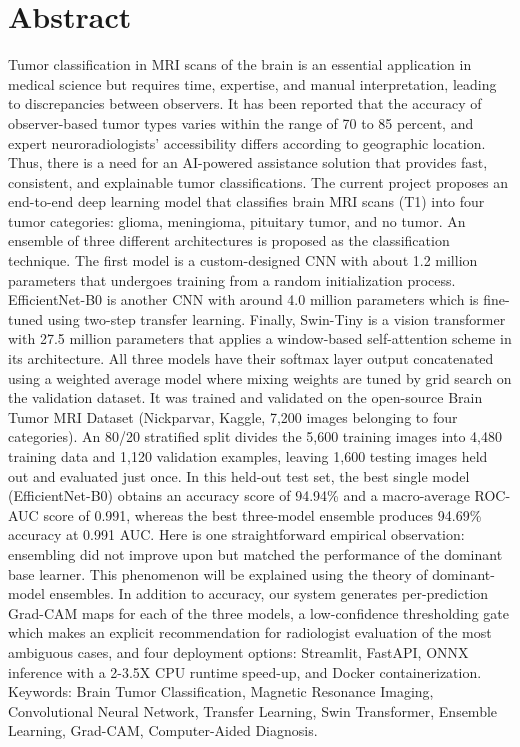 \documentclass[12pt,a4paper,oneside]{report}
\begin{document}
\chapter*{Abstract}
Tumor classification in MRI scans of the brain is an essential application in medical science but requires time, expertise, and manual interpretation, leading to discrepancies between observers. It has been reported that the accuracy of observer-based tumor types varies within the range of 70 to 85 percent, and expert neuroradiologists' accessibility differs according to geographic location. Thus, there is a need for an AI-powered assistance solution that provides fast, consistent, and explainable tumor classifications.
The current project proposes an end-to-end deep learning model that classifies brain MRI scans (T1) into four tumor categories: glioma, meningioma, pituitary tumor, and no tumor. An ensemble of three different architectures is proposed as the classification technique. The first model is a custom-designed CNN with about 1.2 million parameters that undergoes training from a random initialization process. EfficientNet-B0 is another CNN with around 4.0 million parameters which is fine-tuned using two-step transfer learning. Finally, Swin-Tiny is a vision transformer with 27.5 million parameters that applies a window-based self-attention scheme in its architecture. All three models have their softmax layer output concatenated using a weighted average model where mixing weights are tuned by grid search on the validation dataset.
It was trained and validated on the open-source Brain Tumor MRI Dataset (Nickparvar, Kaggle, 7,200 images belonging to four categories). An 80/20 stratified split divides the 5,600 training images into 4,480 training data and 1,120 validation examples, leaving 1,600 testing images held out and evaluated just once. In this held-out test set, the best single model (EfficientNet-B0) obtains an accuracy score of 94.94\% and a macro-average ROC-AUC score of 0.991, whereas the best three-model ensemble produces 94.69\% accuracy at 0.991 AUC. Here is one straightforward empirical observation: ensembling did not improve upon but matched the performance of the dominant base learner. This phenomenon will be explained using the theory of dominant-model ensembles.
In addition to accuracy, our system generates per-prediction Grad-CAM maps for each of the three models, a low-confidence thresholding gate which makes an explicit recommendation for radiologist evaluation of the most ambiguous cases, and four deployment options: Streamlit, FastAPI, ONNX inference with a 2-3.5X CPU runtime speed-up, and Docker containerization.
Keywords: Brain Tumor Classification, Magnetic Resonance Imaging, Convolutional Neural Network, Transfer Learning, Swin Transformer, Ensemble Learning, Grad-CAM, Computer-Aided Diagnosis.
\end{document}

